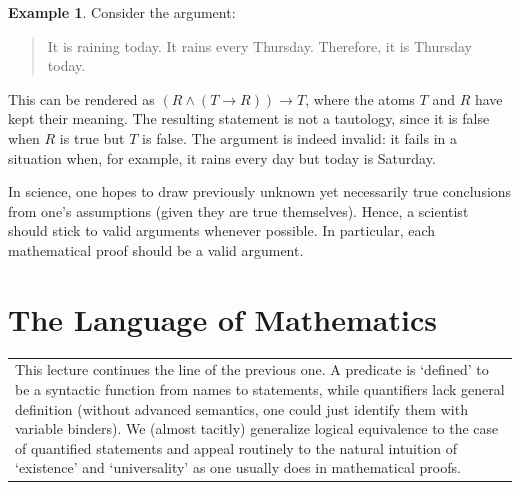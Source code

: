 \documentclass[12pt,notitlepage]{article}
\theoremstyle{plain}
\theoremstyle{definition}
\newtheorem{exm}[thm]{Example}
\theoremstyle{plain}
\newcommand{\1}{\mathbf{1}}
\newcommand{\0}{\mathbf{0}}
\newcommand{\mcomm}[1]{
\medskip\noindent\begin{tabular}{| l}
\parbox{0.99\textwidth}{{\small
#1 }}\end{tabular}
\smallskip}
\begin{document}
\begin{exm}
Consider the argument:
\begin{quote}
It is raining today. It rains every Thursday. Therefore, it is Thursday today.
\end{quote}
This can be rendered as $(R \wedge (T \to R)) \to T$, where the atoms $T$ and $R$ have kept their meaning. The resulting statement is not a tautology, since it is false when $R$ is true but $T$ is false. The argument is indeed invalid: it fails in a situation when, for example, it rains every day but today is Saturday.
\end{exm}

In science, one hopes to draw previously unknown yet necessarily true conclusions from one's assumptions (given they are true themselves). Hence, a scientist should stick to valid arguments whenever possible. In particular, each mathematical proof should be a valid argument.

\newpage
\section{The Language of Mathematics}
\mcomm{This lecture continues the line of the previous one. A predicate is `defined' to be a syntactic function from names to statements, while quantifiers lack general definition (without advanced semantics, one could just identify them with variable binders). We (almost tacitly) generalize logical equivalence to the case of quantified statements and appeal routinely to the natural intuition of `existence' and `universality' as one usually does in mathematical proofs.}
\end{document}

